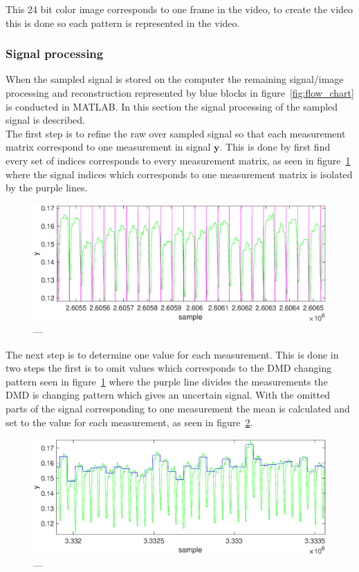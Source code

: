 This 24 bit color image corresponds to one frame in the video, to create the video this is done so each pattern is represented in the video.



\subsubsection{Signal processing}
\label{sec:signal_process}  
When the sampled signal is stored on the computer the remaining signal/image processing and reconstruction represented by blue blocks in figure~\ref{fig:flow_chart} is conducted in MATLAB. In this section the signal processing of the sampled signal is described.\\[0.1in]

The first step is to refine the raw over sampled signal so that each measurement matrix correspond to one measurement in signal $\mathbf{y}$. This is done by first find every set of indices corresponds to every measurement matrix, as seen in figure~\ref{fig:raw_signal} where the signal indices which corresponds to one measurement matrix is isolated by the purple lines.


\begin{figure}[H]
\includegraphics[width = 1\linewidth]{gfx/signal_proc/isolated_raw_signal.eps}
\caption{---}
	\label{fig:raw_signal}
\end{figure}

The next step is to determine one value for each measurement. This is done in two steps the first is to omit values which corresponds to the DMD changing pattern seen in figure~\ref{fig:raw_signal} where the purple line divides the measurements the DMD is changing pattern which gives an uncertain signal. With the omitted parts of the signal corresponding to one measurement the mean is calculated and set to the value for each measurement, as seen in figure~\ref{fig:detarmain_signal}. 

\begin{figure}[H]
\includegraphics[width = 1\linewidth]{gfx/signal_proc/isolated_final_signal.eps}
\caption{---}
	\label{fig:detarmain_signal}
\end{figure}



